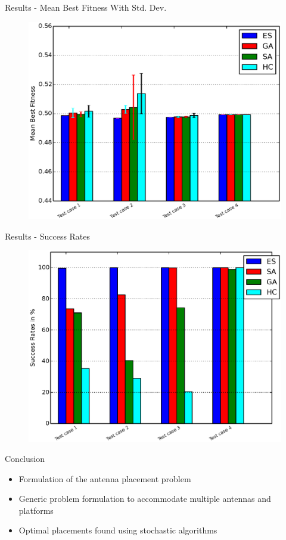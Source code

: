 \documentclass{beamer}
\begin{document}
\begin{frame}{Results - Mean Best Fitness With Std. Dev.}
    \begin{figure}
        \vspace*{-0.35cm}
        \centering
        \includegraphics[scale=0.48]{../paper/FIG/tc_mfwerr}
    \end{figure}
\end{frame}

\begin{frame}{Results - Success Rates}
    \begin{figure}
        \vspace*{-0.35cm}
        \centering
        \includegraphics[scale=0.48]{../paper/FIG/tc_sp}
    \end{figure}
\end{frame}

\begin{frame}{Conclusion}
    \begin{itemize}
        \item Formulation of the antenna placement problem
        \item Generic problem formulation to accommodate multiple antennas and platforms
        \item Optimal placements found using stochastic algorithms
    \end{itemize}
\end{frame}
\end{document}
